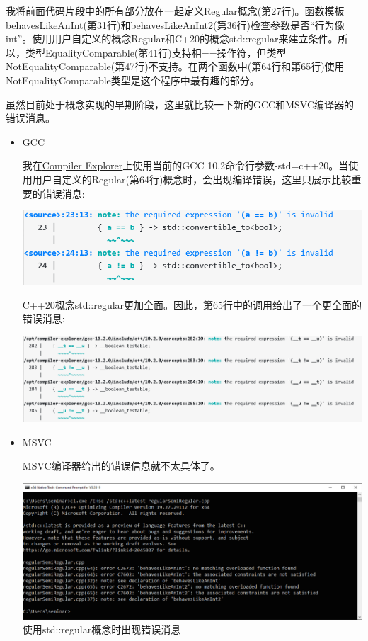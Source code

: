 我将前面代码片段中的所有部分放在一起定义Regular概念(第27行)。函数模板behavesLikeAnInt(第31行)和behavesLikeAnInt2(第36行)检查参数是否“行为像int”。使用用户自定义的概念Regular和C+20的概念std::regular来建立条件。所以，类型EqualityComparable(第41行)支持相==操作符，但类型NotEqualityComparable(第47行)不支持。在两个函数中(第64行和第65行)使用NotEqualityComparable类型是这个程序中最有趣的部分。

虽然目前处于概念实现的早期阶段，这里就比较一下新的GCC和MSVC编译器的错误消息。

\begin{itemize}
\item
GCC

我在\href{https://godbolt.org/}{Compiler Explorer}上使用当前的GCC 10.2命令行参数-std=c++20。当使用用户自定义的Regular(第64行)概念时，会出现编译错误，这里只展示比较重要的错误消息:

\begin{center}
\includegraphics[width=1.0\textwidth]{content/3/chapter4/images/1-6.png}\\
\end{center}

C++20概念std::regular更加全面。因此，第65行中的调用给出了一个更全面的错误消息:

\begin{center}
\includegraphics[width=1.0\textwidth]{content/3/chapter4/images/1-7.png}\\
\end{center}

\item
MSVC

MSVC编译器给出的错误信息就不太具体了。

\begin{center}
\includegraphics[width=1.0\textwidth]{content/3/chapter4/images/10.png}\\
使用std::regular概念时出现错误消息
\end{center}


\end{itemize}
